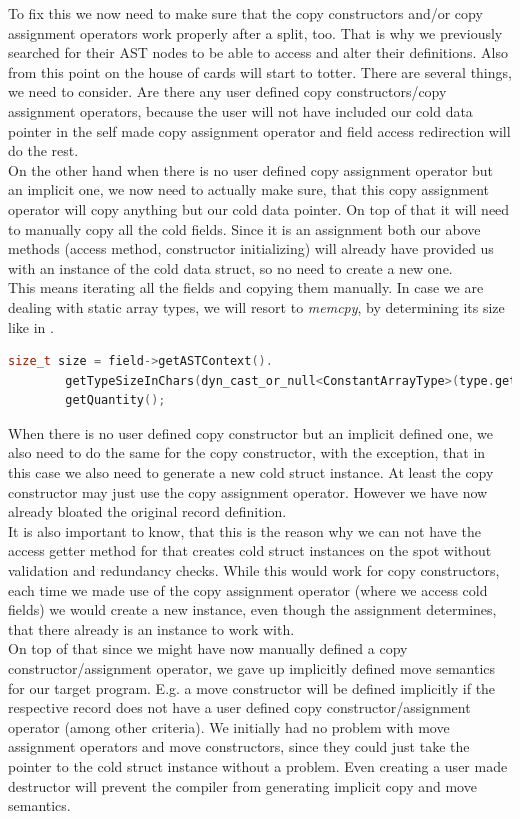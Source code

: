 To fix this we now need to make sure that the copy constructors and/or copy assignment operators work properly after a split, too. That is why we previously searched for their AST nodes to be able to access and alter their definitions. Also from this point on the house of cards will start to totter. There are several things, we need to consider. Are there any user defined copy constructors/copy assignment operators, because the user will not have included our cold data pointer in the self made copy assignment operator and field access redirection will do the rest.\\
On the other hand when there is no user defined copy assignment operator but an implicit one, we now need to actually make sure, that this copy assignment operator will copy anything but our cold data pointer. On top of that it will need to manually copy all the cold fields. Since it is an assignment both our above methods (access method, constructor initializing) will already have provided us with an instance of the cold data struct, so no need to create a new one.\\
This means iterating all the fields and copying them manually. In case we are dealing with static array types, we will resort to \textit{memcpy}, by determining its size like in .
\begin{lstlisting}[language=C++, name={Retrieving the size of a static array type through its AST node.}, label={memcpy_quant}]
	size_t size = field->getASTContext().
		getTypeSizeInChars(dyn_cast_or_null<ConstantArrayType>(type.getTypePtr())).
		getQuantity();
\end{lstlisting}
When there is no user defined copy constructor but an implicit defined one, we also need to do the same for the copy constructor, with the exception, that in this case we also need to generate a new cold struct instance. At least the copy constructor may just use the copy assignment operator. However we have now already bloated the original record definition.\\
It is also important to know, that this is the reason why we can not have the access getter method for that creates cold struct instances on the spot without validation and redundancy checks. While this would work for copy constructors, each time we made use of the copy assignment operator (where we access cold fields) we would create a new instance, even though the assignment determines, that there already is an instance to work with.\\
On top of that since we might have now manually defined a copy constructor/assignment operator, we gave up implicitly defined move semantics for our target program. E.g. a move constructor will be defined implicitly if the respective record does not have a user defined copy constructor/assignment operator  (among other criteria). We initially had no problem with move assignment operators and move constructors, since they could just take the pointer to the cold struct instance without a problem. Even creating a user made destructor will prevent the compiler from generating implicit copy and move semantics.\\

